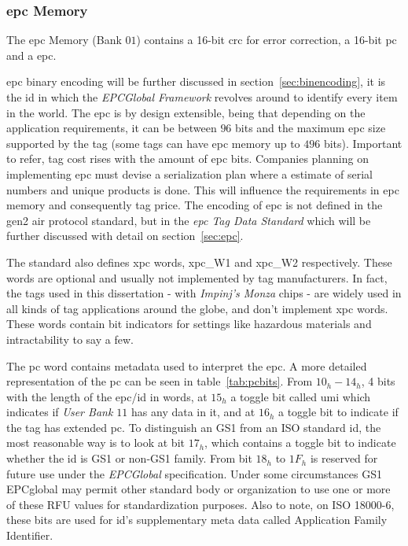 \subsubsection{\ac{epc} Memory}

The \ac{epc} Memory (Bank $01$) contains a 16-bit \ac{crc} for error correction, a 16-bit \ac{pc} and a \ac{epc}.

\ac{epc} binary encoding will be further discussed in section~\ref{sec:binencoding}, it is the \ac{id} in which the \emph{EPCGlobal Framework} revolves around to identify every item in the world. The \ac{epc} is by design extensible, being that depending on the application requirements, it can be between $96$ bits and the maximum \ac{epc} size supported by the tag (some tags can have \ac{epc} memory up to $496$ bits). Important to refer, tag cost rises with the amount of \ac{epc} bits. Companies planning on implementing \ac{epc} must devise a serialization plan where a estimate of serial numbers and unique products is done. This will influence the requirements in \ac{epc} memory and consequently tag price.
The encoding of \ac{epc} is not defined in the \ac{gen2} air protocol standard, but in the \emph{\ac{epc} Tag Data Standard} which will be further discussed with detail on section~\ref{sec:epc}.

The standard also defines \ac{xpc} words, \acs{xpc}\_W1 and \acs{xpc}\_W2 respectively. These words are optional and usually not implemented by tag manufacturers. In fact, the tags used in this dissertation - with \textit{Impinj's Monza} chips - are widely used in all kinds of tag applications around the globe, and don't implement \ac{xpc} words. These words contain bit indicators for settings like hazardous materials and intractability to say a few.

The \ac{pc} word contains metadata used to interpret the \ac{epc}. A more detailed representation of the \ac{pc} can be seen in table~\ref{tab:pcbits}.
From $10_h-14_h$, 4 bits with the length of the \ac{epc}/\ac{id} in words, at $15_h$ a toggle bit called \ac{umi} which indicates if \emph{User Bank $11$} has any data in it, and at $16_h$ a toggle bit to indicate if the tag has extended \ac{pc}.
To distinguish an GS1 from an ISO standard \ac{id}, the most reasonable way is to look at bit $17_h$, which contains a toggle bit to indicate whether the \ac{id} is GS1 or non-GS1 family.
From bit $18_h$ to $1F_h$ is reserved for future use under the \emph{EPCGlobal} specification. Under some circumstances GS1 EPCglobal may permit other standard body or organization to use one or more of these RFU values for standardization purposes. Also to note, on ISO 18000-6, these bits are used for \ac{id}'s supplementary meta data called Application Family Identifier.


